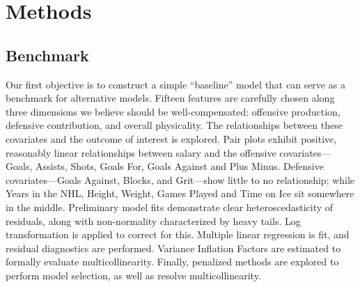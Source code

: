 \documentclass[10pt]{article}
\begin{document}
\section{Methods}
\subsection{Benchmark}
Our first objective is to construct a simple “baseline” model that can serve as a benchmark for alternative models. Fifteen features are carefully chosen along three dimensions we believe should be well-compensated: offensive production, defensive contribution, and overall physicality. The relationships between these covariates and the outcome of interest is explored. Pair plots exhibit positive, reasonably linear relationships between salary and the offensive covariates—Goals, Assists, Shots, Goals For, Goals Against and Plus Minus. Defensive covariates—Goals Against, Blocks, and Grit—show little to no relationship; while Years in the NHL, Height, Weight, Games Played and Time on Ice sit somewhere in the middle. Preliminary model fits demonstrate clear heteroscedasticity of residuals, along with non-normality characterized by heavy tails. Log transformation is applied to correct for this.
Multiple linear regression is fit, and residual diagnostics are performed. Variance Inflation Factors are estimated to formally evaluate multicollinearity. Finally, penalized methods are explored to perform model selection, as well as resolve multicollinearity. 
\end{document}

